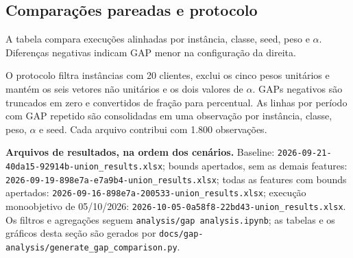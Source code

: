 \documentclass[11pt,a4paper]{article}
\begin{document}
\subsection{Comparações pareadas e protocolo}

A tabela compara execuções alinhadas por instância, classe, seed, peso e
$\alpha$. Diferenças negativas indicam GAP menor na configuração da direita.



O protocolo filtra instâncias com 20 clientes, exclui os cinco pesos unitários
e mantém os seis vetores não unitários e os dois valores de $\alpha$. GAPs
negativos são truncados em zero e convertidos de fração para percentual. As
linhas por período com GAP repetido são consolidadas em uma observação por
instância, classe, peso, $\alpha$ e seed. Cada arquivo contribui com 1.800
observações.

\noindent\textbf{Arquivos de resultados, na ordem dos cenários.}
Baseline: \nolinkurl{2026-09-21-40da15-92914b-union_results.xlsx}; bounds
apertados, sem as demais features:
\nolinkurl{2026-09-19-898e7a-e7a9b4-union_results.xlsx}; todas as features
com bounds apertados:
\nolinkurl{2026-09-16-898e7a-200533-union_results.xlsx}; execução
monoobjetivo de 05/10/2026:
\nolinkurl{2026-10-05-0a58f8-22bd43-union_results.xlsx}. Os filtros e
agregações seguem \texttt{analysis/gap analysis.ipynb}; as tabelas e os
gráficos desta seção são gerados por
\texttt{docs/gap-analysis/generate\_gap\_comparison.py}.
\end{document}

